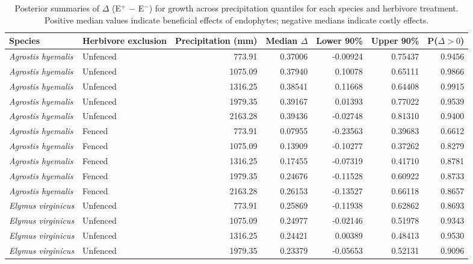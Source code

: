 \documentclass[12pt]{article}\usepackage[]{graphicx}\usepackage[dvipsnames]{xcolor}
\begin{document}
\begin{landscape}
\begin{table}[ht]
\centering
\small
\caption[Summaries of $\Delta$ (E$^{+}$ $-$ E$^{-}$) for growth across precipitation quantiles]{Posterior summaries of $\Delta$ (E$^{+}$ $-$ E$^{-}$) for growth across precipitation quantiles for each species and herbivore treatment. 
Positive median values indicate beneficial effects of endophytes; negative medians indicate costly effects.}
\label{tab:delta_summary_grow}
\begin{tabular}{llrrrrr}
\hline
\textbf{Species} & \textbf{Herbivore exclusion} & \textbf{Precipitation (mm)} & \textbf{Median $\Delta$} & \textbf{Lower 90\%} & \textbf{Upper 90\%} & \textbf{P($\Delta>0$)} \\
\hline
\textit{Agrostis hyemalis} & Unfenced & 773.91  & 0.37006  & -0.00924  & 0.75437  & 0.9456 \\
\textit{Agrostis hyemalis} & Unfenced & 1075.09 & 0.37940  & 0.10078   & 0.65111  & 0.9866 \\
\textit{Agrostis hyemalis} & Unfenced & 1316.25 & 0.38541  & 0.11668   & 0.64408  & 0.9915 \\
\textit{Agrostis hyemalis} & Unfenced & 1979.35 & 0.39167  & 0.01393   & 0.77022  & 0.9539 \\
\textit{Agrostis hyemalis} & Unfenced & 2163.28 & 0.39436  & -0.02748  & 0.81310  & 0.9400 \\
\textit{Agrostis hyemalis} & Fenced   & 773.91  & 0.07955  & -0.23563  & 0.39683  & 0.6612 \\
\textit{Agrostis hyemalis} & Fenced   & 1075.09 & 0.13909  & -0.10277  & 0.37262  & 0.8279 \\
\textit{Agrostis hyemalis} & Fenced   & 1316.25 & 0.17455  & -0.07319  & 0.41710  & 0.8781 \\
\textit{Agrostis hyemalis} & Fenced   & 1979.35 & 0.24676  & -0.11528  & 0.60922  & 0.8733 \\
\textit{Agrostis hyemalis} & Fenced   & 2163.28 & 0.26153  & -0.13527  & 0.66118  & 0.8657 \\
\textit{Elymus virginicus} & Unfenced & 773.91  & 0.25869  & -0.11938  & 0.62862  & 0.8693 \\
\textit{Elymus virginicus} & Unfenced & 1075.09 & 0.24977  & -0.02146  & 0.51978  & 0.9343 \\
\textit{Elymus virginicus} & Unfenced & 1316.25 & 0.24421  & 0.00389   & 0.48413  & 0.9530 \\
\textit{Elymus virginicus} & Unfenced & 1979.35 & 0.23379  & -0.05653  & 0.52131  & 0.9096 \\

\end{tabular}
\end{table}
\end{landscape}
\end{document}
